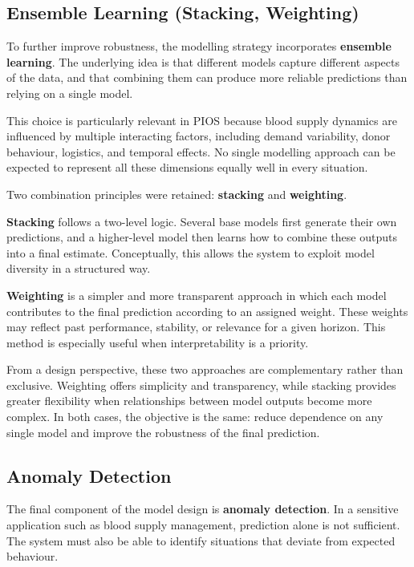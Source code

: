 \subsection{Ensemble Learning (Stacking, Weighting)}
\label{sec:ensemble-learning}

To further improve robustness, the modelling strategy incorporates \textbf{ensemble learning}. The underlying idea is that different models capture different aspects of the data, and that combining them can produce more reliable predictions than relying on a single model.

This choice is particularly relevant in PIOS because blood supply dynamics are influenced by multiple interacting factors, including demand variability, donor behaviour, logistics, and temporal effects. No single modelling approach can be expected to represent all these dimensions equally well in every situation.

Two combination principles were retained: \textbf{stacking} and \textbf{weighting}.

\textbf{Stacking} follows a two-level logic. Several base models first generate their own predictions, and a higher-level model then learns how to combine these outputs into a final estimate. Conceptually, this allows the system to exploit model diversity in a structured way.

\textbf{Weighting} is a simpler and more transparent approach in which each model contributes to the final prediction according to an assigned weight. These weights may reflect past performance, stability, or relevance for a given horizon. This method is especially useful when interpretability is a priority.

From a design perspective, these two approaches are complementary rather than exclusive. Weighting offers simplicity and transparency, while stacking provides greater flexibility when relationships between model outputs become more complex. In both cases, the objective is the same: reduce dependence on any single model and improve the robustness of the final prediction.

\subsection{Anomaly Detection}
\label{sec:anomaly-detection}

The final component of the model design is \textbf{anomaly detection}. In a sensitive application such as blood supply management, prediction alone is not sufficient. The system must also be able to identify situations that deviate from expected behaviour.

